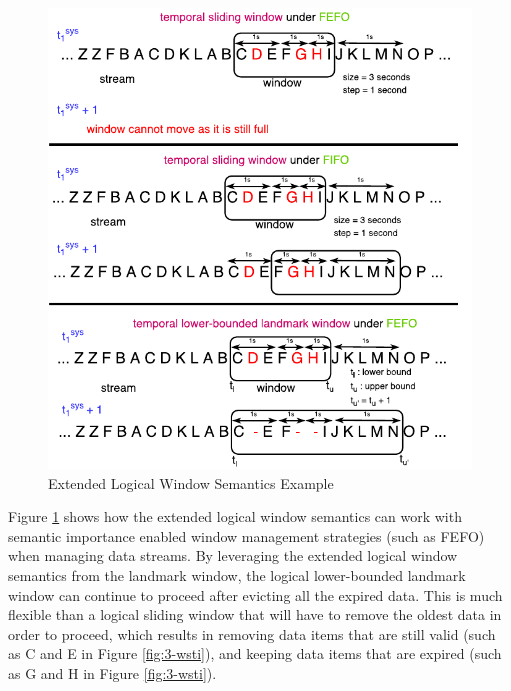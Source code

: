 \begin{figure}[!htbp]
	\centering
    \includegraphics[width=5in]{img/3-psewsti.pdf}
    \caption{Extended Logical Window Semantics Example}
    \label{fig:3-psewsti}
\end{figure}

Figure \ref{fig:3-psewsti} shows how the extended logical window semantics can work with semantic importance enabled window management strategies (such as FEFO) when managing data streams. 
By leveraging the extended logical window semantics from the landmark window, the logical lower-bounded landmark window can continue to proceed after evicting all the expired data.
This is much flexible than a logical sliding window that will have to remove the oldest data in order to proceed, which results in removing data items that are still valid (such as C and E in Figure \ref{fig:3-wsti}), and keeping data items that are expired (such as G and H in Figure \ref{fig:3-wsti}). 

